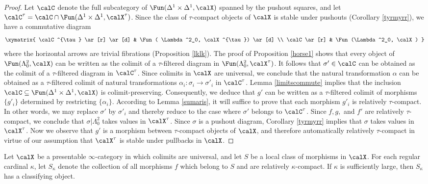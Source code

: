 \begin{proof}
Let $\calC$ denote the full subcategory of $\Fun(\Delta^1 \times \Delta^1, \calX)$ spanned by the pushout squares, and let $\calC^{\tau} = \calC \cap \Fun( \Delta^1 \times \Delta^1, \calX^{\tau})$.
Since the class of $\tau$-compact objects of $\calX$ is stable under pushouts (Corollary \ref{tyrmyrr}), we have a commutative diagram
$$ \xymatrix{ \calC^{\tau} \ar[r] \ar[d] & \Fun( \Lambda^2_0, \calX^{\tau})  \ar[d] \\
\calC \ar[r] & \Fun(\Lambda^2_0, \calX) }$$
where the horizontal arrows are trivial fibrations (Proposition \ref{lklk}). The proof of Proposition
\ref{horse1} shows that every object of $\Fun(\Lambda^2_0, \calX)$ can be written as the colimit of a $\tau$-filtered diagram in $\Fun(\Lambda^2_0, \calX^{\tau})$. It follows that $\sigma' \in \calC$
can be obtained as the colimit of a $\tau$-filtered diagram in $\calC^{\tau}$. Since
colimits in $\calX$ are universal, we conclude that the natural transformation $\alpha$
can be obtained as a $\tau$-filtered colimit of natural transformations
$ \alpha_{i}: \sigma_{i} \rightarrow \sigma'_{i}$ in $\calC^{\tau}$. Lemma \ref{limitscommute} implies that the inclusion $\calC \subseteq \Fun(\Delta^1 \times \Delta^1, \calX)$ is colimit-preserving. Consequently, we deduce that $g'$ can be written as a $\tau$-filtered colimit of morphisms
$\{ g'_{i} \}$ determined by restricting $\{ \alpha_i \}$. According to Lemma \ref{sumaris}, it will suffice to prove that each morphism $g'_{i}$ is relatively $\tau$-compact. In other words, we may replace $\sigma'$ by $\sigma'_i$ and thereby reduce to the case where $\sigma'$ belongs to $\calC^{\tau}$. Since $f,g,$ and $f'$ are relatively $\tau$-compact, we conclude that
$\sigma | \Lambda^2_0$ takes values in $\calX^{\tau}$. Since $\sigma$ is a pushout diagram, Corollary \ref{tyrmyrr} implies that $\sigma$ takes values in $\calX^{\tau}$. Now we observe that $g'$ is a morphism between $\tau$-compact objects of $\calX$, and therefore automatically relatively $\tau$-compact in virtue of our assumption that $\calX^{\tau}$ is stable under pullbacks in $\calX$.
\end{proof}


\begin{proposition}\label{cardyp}  
Let $\calX$ be a presentable $\infty$-category in which colimits are universal, and let
$S$ be a local class of morphisms in $\calX$. For each regular cardinal $\kappa$, 
let $S_{\kappa}$ denote the collection of all morphisms $f$ which belong to $S$ and are relatively $\kappa$-compact. If $\kappa$ is sufficiently large, then $S_{\kappa}$ has a classifying object.
\end{proposition}

